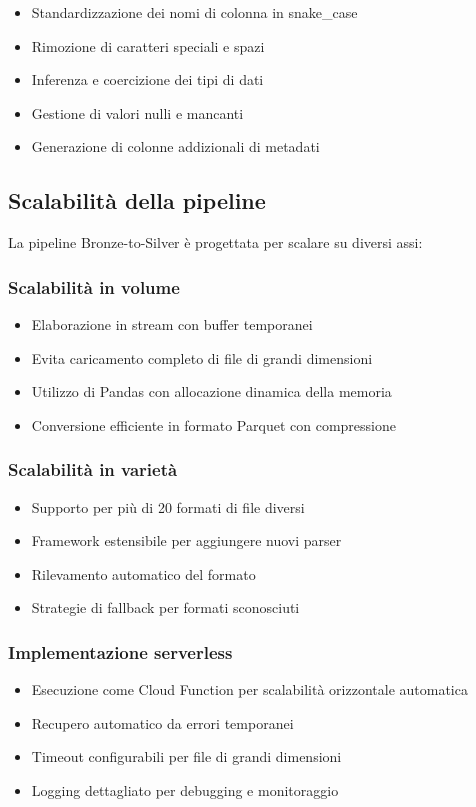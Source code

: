 \documentclass[11pt,a4paper,twoside]{report}
\begin{document}
\begin{itemize}
    \item Standardizzazione dei nomi di colonna in snake\_case
    \item Rimozione di caratteri speciali e spazi
    \item Inferenza e coercizione dei tipi di dati
    \item Gestione di valori nulli e mancanti
    \item Generazione di colonne addizionali di metadati
\end{itemize}

\subsection{Scalabilità della pipeline}

La pipeline Bronze-to-Silver è progettata per scalare su diversi assi:

\subsubsection{Scalabilità in volume}
\begin{itemize}
    \item Elaborazione in stream con buffer temporanei
    \item Evita caricamento completo di file di grandi dimensioni
    \item Utilizzo di Pandas con allocazione dinamica della memoria
    \item Conversione efficiente in formato Parquet con compressione
\end{itemize}

\subsubsection{Scalabilità in varietà}
\begin{itemize}
    \item Supporto per più di 20 formati di file diversi
    \item Framework estensibile per aggiungere nuovi parser
    \item Rilevamento automatico del formato
    \item Strategie di fallback per formati sconosciuti
\end{itemize}

\subsubsection{Implementazione serverless}
\begin{itemize}
    \item Esecuzione come Cloud Function per scalabilità orizzontale automatica
    \item Recupero automatico da errori temporanei
    \item Timeout configurabili per file di grandi dimensioni
    \item Logging dettagliato per debugging e monitoraggio
\end{itemize}
\end{document}
